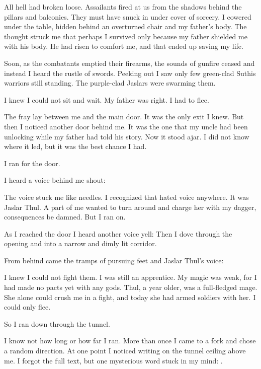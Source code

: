 \documentclass
  [a4paper,
   12pt,
   oneside
  ]%
  {article}
\begin{document}

All hell had broken loose.
Assailants fired at us from the shadows behind the pillars and balconies. 
They must have snuck in under cover of sorcery.
I cowered under the table, hidden behind an overturned chair and my father's body. 
The thought struck me that perhaps I survived only because my father shielded me with his body. 
He had risen to comfort me, and that ended up saving my life.

Soon, as the combatants emptied their firearms, the sounds of gunfire ceased and 
instead I heard the rustle of swords.
Peeking out I saw only few green-clad Suthis warriors still standing. 
The purple-clad Jaslars were swarming them. 

I knew I could not sit and wait. 
My father was right. 
I had to flee.

The fray lay between me and the main door. 
It was the only exit I knew. 
But then I noticed another door behind me. 
It was the one that my uncle had been unlocking while my father had told his story. 
Now it stood ajar. 
I did not know where it led, but it was the best chance I had. 

I ran for the door. 

I heard a voice behind me shout:

The voice stuck me like needles. 
I recognized that hated voice anywhere.
It was Jaslar Thul.
A part of me wanted to turn around and charge her with my dagger, consequences be damned.
But I ran on.

As I reached the door I heard another voice yell: 
Then I dove through the opening and into a narrow and dimly lit corridor. 

From behind came the tramps of pursuing feet and Jaslar Thul's voice: 

I knew I could not fight them. 
I was still an apprentice. 
My magic was weak, for I had made no pacts yet with any gods.
Thul, a year older, was a full-fledged mage. 
She alone could crush me in a fight, and today she had armed soldiers with her. 
I could only flee.

So I ran down through the tunnel.

I know not how long or how far I ran. 
More than once I came to a fork and chose a random direction.
At one point I noticed writing on the tunnel ceiling above me. 
I forgot the full text, but one mysterious word stuck in my mind: 
\quo{\emph{\Ubloth{}}}.
\end{document}

